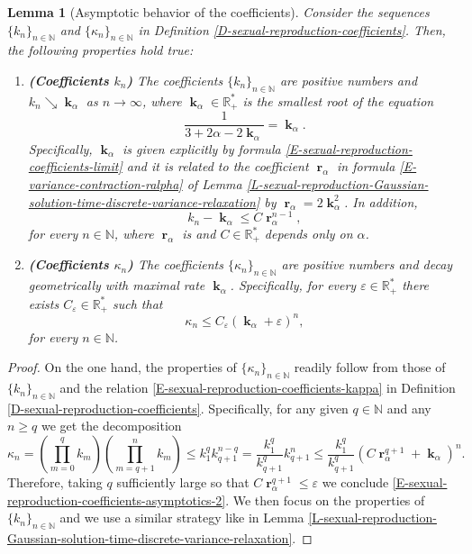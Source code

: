 \documentclass[reqno]{amsart}
\newtheorem{lemma}[definition]{Lemma}
\DeclareMathOperator{\bk}{\boldsymbol{k}}
\DeclareMathOperator{\br}{\boldsymbol{r}}
\numberwithin{equation}{section}
\begin{document}
{\begin{lemma}[Asymptotic behavior of the coefficients]\label{L-sexual-reproduction-coefficients-asymptotics}
Consider the sequences $\{k_n\}_{n\in \mathbb{N}}$ and $\{\kappa_n\}_{n\in \mathbb{N}}$ in Definition \ref{D-sexual-reproduction-coefficients}. Then, the following properties hold true:
\begin{enumerate}
\item {\bf (Coefficients $k_n$)} The coefficients $\{k_n\}_{n\in \mathbb{N}}$ are positive numbers and $k_n\searrow \bk_\alpha$ as $n\rightarrow \infty$, where $\bk_\alpha\in \mathbb{R}_+^*$ is the smallest root of the equation
\begin{equation}\label{E-sexual-reproduction-coefficients-root}
\frac{1}{3+2\alpha-2\bk_\alpha}=\bk_\alpha.
\end{equation}
Specifically, $\bk_\alpha$ is given explicitly by formula \eqref{E-sexual-reproduction-coefficients-limit} and it is related to the coefficient $\br_\alpha$ in formula \eqref{E-variance-contraction-ralpha} of Lemma \ref{L-sexual-reproduction-Gaussian-solution-time-discrete-variance-relaxation} by $\br_\alpha=2\bk_\alpha^2$. In addition,
\begin{equation}\label{E-sexual-reproduction-coefficients-asymptotics}
k_n-\bk_\alpha\leq C\br_\alpha^{n-1},
\end{equation}
for every $n\in \mathbb{N}$, where $\br_\alpha$ is and $C\in \mathbb{R}_+^*$ depends only on $\alpha$. 
\item {\bf (Coefficients $\kappa_n$)} The coefficients $\{\kappa_n\}_{n\in \mathbb{N}}$ are positive numbers and decay geometrically with maximal rate $\bk_\alpha$. Specifically, for every $\varepsilon\in \mathbb{R}_+^*$ there exists $C_\varepsilon\in \mathbb{R}_+^*$ such that
\begin{equation}\label{E-sexual-reproduction-coefficients-asymptotics-2}
\kappa_n\leq C_\varepsilon (\bk_\alpha+\varepsilon)^n,
\end{equation}
for every $n\in \mathbb{N}$.
\end{enumerate}
\end{lemma}

\begin{proof}
On the one hand, the properties of $\{\kappa_n\}_{n\in \mathbb{N}}$ readily follow from those of $\{k_n\}_{n\in \mathbb{N}}$ and the relation \eqref{E-sexual-reproduction-coefficients-kappa} in Definition \ref{D-sexual-reproduction-coefficients}. Specifically, for any given $q\in \mathbb{N}$ and any $n\geq q$ we get the decomposition
$$\kappa_n=\left(\prod_{m=0}^q k_m\right)\left(\prod_{m=q+1}^n k_m\right)\leq k_1^q k_{q+1}^{n-q}=\frac{k_1^q}{k_{q+1}^q}k_{q+1}^n\leq \frac{k_1^q}{k_{q+1}^q} (C\br_\alpha^{q+1}+\bk_\alpha)^n.$$
Therefore, taking $q$ sufficiently large so that $C\br_\alpha^{q+1}\leq \varepsilon$ we conclude \eqref{E-sexual-reproduction-coefficients-asymptotics-2}. We then focus on the properties of $\{k_n\}_{n\in \mathbb{N}}$ and we use a similar strategy like in Lemma \ref{L-sexual-reproduction-Gaussian-solution-time-discrete-variance-relaxation}.


\end{proof}}
\end{document}

